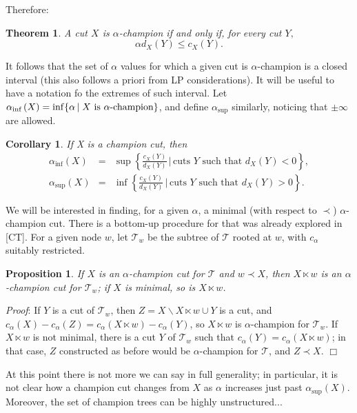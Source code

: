 \documentclass[12pt]{article}
\newenvironment{proof}{
  {\noindent\em Proof\/}:}{\hfill$\Box$\vspace{3 mm}}
\newtheorem{pro}[lem]{Proposition}
\newtheorem{cor}[lem]{Corollary}
\newtheorem{teo}[lem]{Theorem}
\newcommand{\T}{\ensuremath{\mathcal{T}}\xspace}
\newcommand{\conj}[2]{\ensuremath{\{#1\,|\;#2\}}}
\newcommand{\al}{\ensuremath{\alpha}\xspace}
\newcommand{\alinf}{\ensuremath{\alpha_{\inf{}}}\xspace}
\newcommand{\alsup}{\ensuremath{\alpha_{\sup{}}}\xspace}
\newcommand{\ccal}{\ensuremath{c_\alpha}\xspace}
\newcommand{\lt}[2]{\ensuremath{#1\!\!\ltimes\!\!#2}}
\begin{document}
Therefore:

\begin{teo}\label{teo:champ}
  A cut \(X\) is \al-champion if and only if, for every cut \(Y,\)
  \[
    \al d_X(Y) \leq c_X(Y).
  \]
\end{teo}

It follows that the set of \al values for which a given cut is \al-champion is
a closed interval (this also follows a priori from LP considerations).  It
will be useful to have a notation fo the extremes of such interval. Let
\(\alinf(X) = \inf\conj{\al}{X \text{ is \al-champion}}\), and define \alsup
similarly, noticing that \(\pm\infty\) are allowed.

\begin{cor}\label{cor:infsup}
  If X is a champion cut, then
  \begin{eqnarray*}
    \alinf(X) &=& \sup \left\{\frac{c_X(Y)}{d_X(Y)}\,|\,\text{cuts \(Y\) such that\ } d_X(Y)<0\right\},\\
    \alsup(X) &=& \inf \left\{\frac{c_X(Y)}{d_X(Y)}\,|\,\text{cuts \(Y\) such that\ } d_X(Y)>0\right\}.
  \end{eqnarray*}
\end{cor}

We will be interested in finding, for a given \al, a minimal (with respect to
\(\prec\)) \al-champion cut.  There is a bottom-up procedure for that was
already explored in [CT].  For a given node \(w\), let \(\T_w\) be the subtree
of \T rooted at \(w\), with \ccal suitably restricted.

\begin{pro}\label{pro:t-sub-w}
  If \(X\) is an \al-champion cut for \T and \(w\prec X\), then \(\lt{X}{w}\)
  is an \al-champion cut for \(\T_w\); if \(X\) is minimal, so is
  \(\lt{X}{w}\).
\end{pro}
\begin{proof}
  If \(Y\) is a cut of \(\T_w\), then \(Z=X\backslash\lt{X}{w}\cup Y\) is a
  cut, and \(\ccal(X)-\ccal(Z)=\ccal(\lt{X}{w})-\ccal(Y)\), so \(\lt{X}{w}\)
  is \al-champion for \(\T_w\).  If \(\lt{X}{w}\) is not minimal, there is a
  cut \(Y\) of \(\T_w\) such that \(\ccal(Y)=\ccal(\lt{X}{w})\); in that case,
  \(Z\) constructed as before would be \al-champion for \T, and \(Z\prec X\).
\end{proof}


At this point there is not more we can say in full generality; in particular,
it is not clear how a champion cut changes from \(X\) as \al increases just
past \(\alsup(X)\).  Moreover, the set of champion trees can be highly
unstructured...
\end{document}
